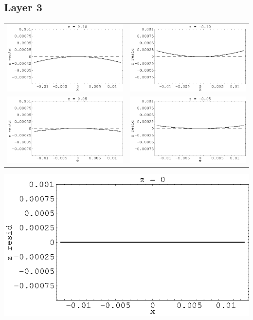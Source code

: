 \documentclass[12pt]{article}
\begin{document}
\pagebreak

\subsection*{Layer 3}
  \begin{tabular}{c c}
    \includegraphics[width=7.3 cm]{layer3_left2.eps} &
    \includegraphics[width=7.3 cm]{layer3_right2.eps} \\
    \includegraphics[width=7.3 cm]{layer3_left1.eps} &
    \includegraphics[width=7.3 cm]{layer3_right1.eps} \\
  \end{tabular}
  \begin{center}
    \includegraphics[width=7.3 cm]{layer3_middle.eps}
  \end{center}
\end{document}

